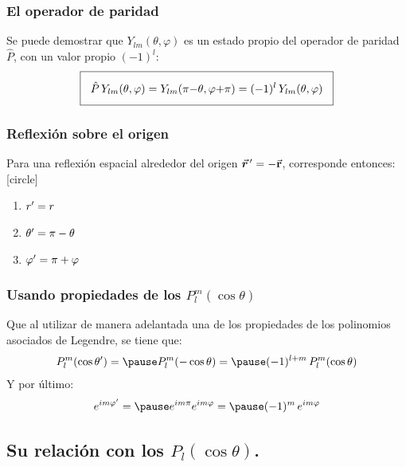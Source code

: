 \documentclass[12pt]{beamer}
\begin{document}
\begin{frame}
\frametitle{El operador de paridad}
Se puede demostrar que $Y_{lm} (\theta, \varphi)$ es un estado propio del operador de paridad $\hat{P}$, con un valor propio $(-1)^{l}$:
\pause
\begin{align*}
\setlength{\fboxsep}{3\fboxsep}\boxed{
\hat{P} \, Y_{lm}(\theta, \varphi) = Y_{lm} (\pi {-} \theta, \varphi {+} \pi) = (-1)^{l} \, Y_{lm}(\theta, \varphi)}
\end{align*}
\end{frame}
\begin{frame}
\frametitle{Reflexión sobre el origen}
Para una reflexión espacial alrededor del origen $\va*{r}^{\, \prime} = - \va{r}$, corresponde entonces:
\pause
{}
[circle]
\begin{enumerate}[<+->]
\item ${r}^{\prime} = r$
\item ${\theta}^{\prime} = \pi - \theta$
\item ${\varphi}^{\prime} = \pi + \varphi$
\end{enumerate}
\end{frame}
\begin{frame}
\frametitle{Usando propiedades de los $P_{l}^{m}(\cos \theta)$}
Que al utilizar de manera adelantada una de los propiedades de los polinomios asociados de Legendre, se tiene que:
\pause
\begin{eqnarray*}
P_{l}^{m} (\cos \pderivada{\theta}) = \pause P_{l}^{m} (- \cos \theta) = \pause (-1)^{l+m} \, P_{l}^{m} (\cos \theta)
\end{eqnarray*}
\pause
Y por último:
\pause
\begin{eqnarray*}
e^{i m \pderivada{\varphi}} = \pause e^{i m \pi} e^{i m \varphi} = \pause (-1)^{m} \, e^{i m \varphi}
\end{eqnarray*}
\end{frame}

\subsection{Su relación con los \texorpdfstring{$P_{l}(\cos \theta)$}{Pl(cos t)}.}
\end{document}
